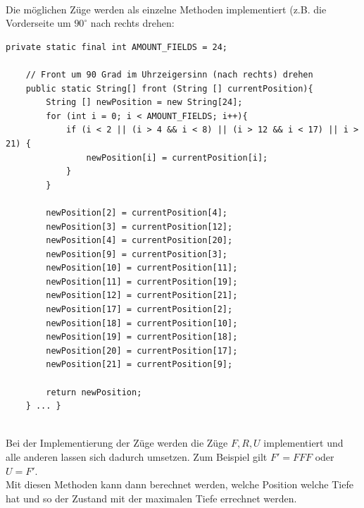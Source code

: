 \documentclass[12pt,a4paper, usenames, dvipsnames]{scrartcl}
\begin{document}
\\
Die möglichen Züge werden als einzelne Methoden implementiert (z.B. die Vorderseite um $90^\circ$ nach rechts drehen:
\begin{verbatim}
private static final int AMOUNT_FIELDS = 24;

    // Front um 90 Grad im Uhrzeigersinn (nach rechts) drehen
    public static String[] front (String [] currentPosition){
        String [] newPosition = new String[24];
        for (int i = 0; i < AMOUNT_FIELDS; i++){
            if (i < 2 || (i > 4 && i < 8) || (i > 12 && i < 17) || i > 21) {
                newPosition[i] = currentPosition[i];
            }
        }

        newPosition[2] = currentPosition[4];
        newPosition[3] = currentPosition[12];
        newPosition[4] = currentPosition[20];
        newPosition[9] = currentPosition[3];
        newPosition[10] = currentPosition[11];
        newPosition[11] = currentPosition[19];
        newPosition[12] = currentPosition[21];
        newPosition[17] = currentPosition[2];
        newPosition[18] = currentPosition[10];
        newPosition[19] = currentPosition[18];
        newPosition[20] = currentPosition[17];
        newPosition[21] = currentPosition[9];

        return newPosition;
    } ... }
\end{verbatim} \\
Bei der Implementierung der Züge werden die Züge $F, R, U$ implementiert und alle anderen lassen sich dadurch umsetzen. Zum Beispiel gilt $F' = FFF$ oder $U=F'$. \\
Mit diesen Methoden kann dann berechnet werden, welche Position welche Tiefe hat und so der Zustand mit der maximalen Tiefe errechnet werden.


\newpage 
\end{document}
